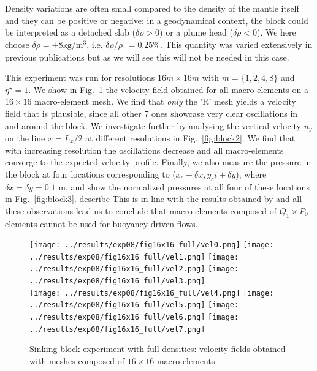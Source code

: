 \documentclass[a4paper,12pt]{article}
\begin{document}
Density variations are often small compared to the density of the mantle itself
and they can be positive or negative: in a geodynamical context, 
the block could be interpreted as a detached slab
($\delta\rho>0$) or a plume head ($\delta\rho<0$). 
We here choose $\delta \rho=+8\si{\kg\per\cubic\metre}$, i.e. $\delta \rho/\rho_1 = 0.25\%$.
This quantity was varied extensively in previous publications but as we will see 
this will not be needed in this case. 

This experiment was run for resolutions $16m\times 16m$ with $m=\{1,2,4,8\}$ and $\eta^\star=1$. 
We show in Fig.~\ref{fig:block1} the velocity field obtained for all macro-elements on 
a $16\times 16$ macro-element mesh. 
We find that {\it only} the 'R' mesh yields a velocity field that is plausible, 
since all other 7 ones showcase very clear oscillations in and around the block.
We investigate further by analysing the vertical velocity $u_y$
on the line $x=L_x/2$ at different resolutions in Fig.~\ref{fig:block2}.
We find that with increasing resolution the oscillations decrease and 
all macro-elements converge to the expected velocity profile.
Finally, we also measure the pressure in the block 
at four locations corresponding to ($x_c \pm \delta x, y_c i\pm \delta y$),
where $\delta x = \delta y = 0.1$ m, and show the normalized pressures
at all four of these locations in Fig.~\ref{fig:block3}.
{\color{red} describe}
This is in line with the results obtained by \cite{thba22} and 
all these observations lead us to conclude that 
macro-elements composed of $Q_1 \times P_0$ elements cannot be used for buoyancy driven flows.

\begin{figure}[t]
\centering
\texttt{[image: ../results/exp08/fig16x16\_full/vel0.png]}
\texttt{[image: ../results/exp08/fig16x16\_full/vel1.png]}
\texttt{[image: ../results/exp08/fig16x16\_full/vel2.png]}
\texttt{[image: ../results/exp08/fig16x16\_full/vel3.png]}\\
\texttt{[image: ../results/exp08/fig16x16\_full/vel4.png]}
\texttt{[image: ../results/exp08/fig16x16\_full/vel5.png]}
\texttt{[image: ../results/exp08/fig16x16\_full/vel6.png]}
\texttt{[image: ../results/exp08/fig16x16\_full/vel7.png]}
\caption{Sinking block experiment with full densities: velocity fields 
obtained with meshes composed of $16\times 16$ macro-elements. \label{fig:block1}}
\end{figure}
\end{document}
